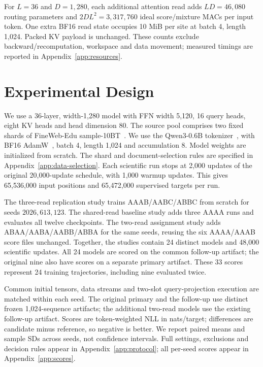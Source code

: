 \documentclass[11pt,letterpaper]{article}
\newcommand{\route}[1]{\textsf{#1}}
\begin{document}
For $L=36$ and $D=1{,}280$, each additional attention read adds
$LD=46{,}080$ routing parameters and
$2DL^2=3{,}317{,}760$ ideal score/mixture MACs per input token.
One extra BF16 read state occupies 10 MiB per site at batch 4, length 1,024.
Packed KV payload is unchanged. These counts exclude backward/recomputation,
workspace and data movement; measured timings are reported in
Appendix~\ref{app:resources}.

\section{Experimental Design}
\label{sec:design}
We use a 36-layer, width-1,280 model with FFN width 5,120, 16 query heads,
eight KV heads and head dimension 80. The source pool comprises two fixed shards
of FineWeb-Edu sample-10BT~\cite{fineweb2024}. %
We use the Qwen3-0.6B tokenizer~\cite{qwen32025}, %
with BF16 AdamW~\cite{adamw2019}, batch 4, length 1,024 and accumulation 8. %
Model weights are initialized from scratch. The shard and document-selection rules are specified
in Appendix~\ref{app:data-selection}.
Each scientific run stops at 2,000 updates of the original 20,000-update
schedule, with 1,000 warmup updates. This gives 65,536,000 input positions
and 65,472,000 supervised targets per run.

The three-read replication study trains \route{AAAB}/\route{AABC}/\route{ABBC}
from scratch for seeds $2026,613,123$. The shared-read baseline study
adds three \route{AAAA} runs and evaluates all twelve checkpoints. The
two-read assignment study adds
\route{ABAA}/\route{AABA}/\route{AABB}/\route{ABBA} for the same seeds,
reusing the six \route{AAAA}/\route{AAAB} score files unchanged. Together,
the studies contain 24 distinct models and 48,000 scientific updates.
All 24 models are scored on the common follow-up artifact; the original nine
also have scores on a separate primary artifact. These 33 scores represent
24 training trajectories, including nine evaluated twice.

Common initial tensors, data streams and two-slot query-projection execution
are matched within each seed. The original primary and the follow-up use
distinct frozen 1,024-sequence artifacts; the additional two-read models use
the existing follow-up artifact. Scores are token-weighted NLL in nats/target; differences are
candidate minus reference, so negative is better. We report paired means
and sample SDs across seeds, not confidence intervals. Full settings,
exclusions and decision rules appear in Appendix~\ref{app:protocol}; all
per-seed scores appear in Appendix~\ref{app:scores}.
\end{document}
